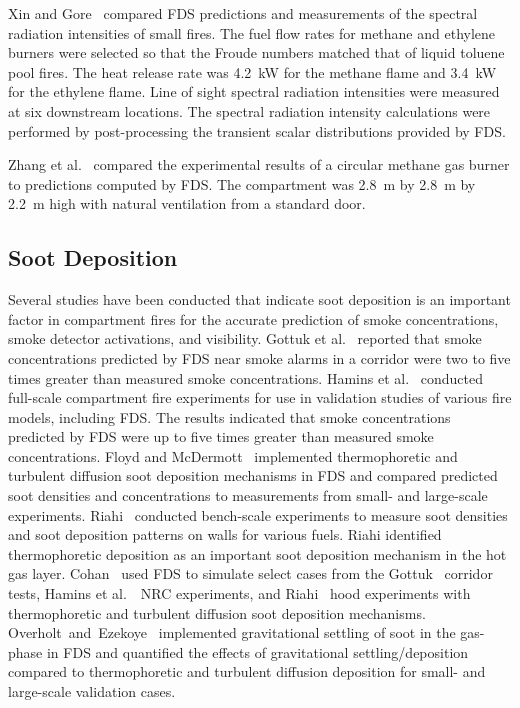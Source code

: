 Xin  and Gore~\cite{Xin:JSS2003}  compared  FDS predictions  and measurements of the spectral radiation intensities of small fires. The fuel flow rates for methane and ethylene burners were selected so that the Froude numbers matched that of liquid toluene pool fires. The heat release rate was 4.2~kW for the methane flame and 3.4~kW for the ethylene flame. Line of sight spectral radiation intensities were measured at six downstream locations.  The spectral radiation intensity calculations were performed by post-processing the transient scalar distributions provided by FDS.

Zhang et al.~\cite{Zhang:1} compared the experimental results of a circular methane gas burner to predictions computed by FDS. The compartment was 2.8~m by 2.8~m by 2.2~m high with natural ventilation from a standard door.




\subsection{Soot Deposition}

Several studies have been conducted that indicate soot deposition is an important factor in compartment fires
for the accurate prediction of smoke concentrations, smoke detector activations, and visibility.
Gottuk et al.~\cite{Gottuk:IAFSS2008} reported that smoke concentrations predicted by FDS near smoke alarms in a
corridor were two to five times greater than measured smoke concentrations. Hamins et al.~\cite{Hamins:SP1013-1}
conducted full-scale compartment fire experiments for use in validation studies of various fire models, including FDS.
The results indicated that smoke concentrations predicted by FDS were up to five times greater than measured
smoke concentrations. Floyd and McDermott~\cite{Floyd:Interflam2010} implemented thermophoretic and turbulent diffusion soot
deposition mechanisms in FDS and compared predicted soot densities and concentrations to measurements from small- and large-scale
experiments. Riahi~\cite{Riahi:2011} conducted bench-scale experiments to measure soot densities and soot
deposition patterns on walls for various fuels. Riahi identified thermophoretic deposition as an important soot deposition
mechanism in the hot gas layer. Cohan~\cite{Cohan:Masters} used FDS to simulate select cases from the
Gottuk~\cite{Gottuk:IAFSS2008} corridor tests, Hamins et al.~\cite{Hamins:SP1013-1}~NRC experiments, and
Riahi~\cite{Riahi:2011} hood experiments with thermophoretic and turbulent diffusion soot deposition mechanisms.
Overholt~and~Ezekoye~\cite{Overholt:1} implemented gravitational settling of soot in the gas-phase in FDS and quantified
the effects of gravitational settling/deposition compared to thermophoretic and turbulent diffusion deposition for small- and
large-scale validation cases.




